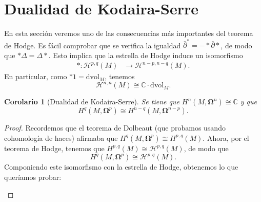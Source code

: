 \documentclass[12pt,a4paper]{article}
\newtheorem{corol}[thm]{Corolario}
\theoremstyle{definition} \newtheorem{defn}[thm]{Definición}
\theoremstyle{definition} \newtheorem{ejemplo}[thm]{Ejemplo}
\theoremstyle{definition} \newtheorem{ejercicio}[thm]{Ejercicio}
\theoremstyle{remark} \newtheorem*{obs}{Observación}
\newcommand{\dvol}{\mathrm{dvol}}
\newcommand{\dol}{\bar{\partial}}
\newcommand{\HH}{\mathcal{H}}
\newcommand{\CC}{\mathbb{C}}
\newcommand{\bomega}{\boldsymbol{\Omega}}
\begin{document}
	\section{Dualidad de Kodaira-Serre}
	En esta sección veremos uno de las consecuencias más importantes del teorema de Hodge.
Es fácil comprobar que se verifica la igualdad $\dol^*=-*\dol *$, de modo que $*\Delta=\Delta*$. Esto implica que la estrella de Hodge induce un isomorfismo
\begin{align*}
  * :\mathcal{H}^{p,q}(M)&\longrightarrow \HH^{n-p,n-q}(M).
  \end{align*}
  En particular, como $*1=\dvol_M$, tenemos
  \begin{equation*}
    \HH^{n,n}(M) \cong \CC\cdot \dvol_M.
  \end{equation*}
  \begin{corol}[Dualidad de Kodaira-Serre]
    Se tiene que $H^n(M,\bomega^n)\cong \CC$ y que
    \begin{equation*}
      H^q(M,\bomega^p) \cong H^{n-q}(M,\bomega^{n-p}).
    \end{equation*}
  \end{corol}
  \begin{proof}
    Recordemos que el teorema de Dolbeaut (que probamos usando cohomología de haces) afirmaba que $H^q(M,\bomega^p)\cong H^{p,q}(M)$. Ahora, por el teorema de Hodge, tenemos que $H^{p,q}(M)\cong \HH^{p,q}(M)$, de modo que $$H^q(M,\bomega^p)\cong \HH^{p,q}(M).$$
    Componiendo este isomorfismo con la estrella de Hodge, obtenemos lo que queríamos probar:
    \begin{center}
    \end{center}
    \begin{center}
    \end{center}
  \end{proof}
\end{document}
